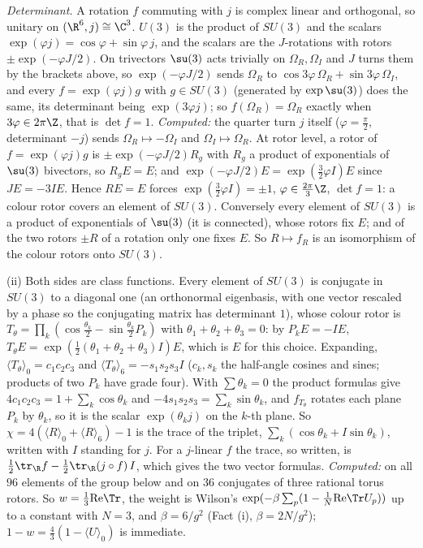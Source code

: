 \emph{Determinant.} A rotation $f$ commuting with $j$ is complex linear and orthogonal, so unitary on $(\R^6, j) \cong \C^3$. $U(3)$ is the product of $SU(3)$ and the scalars $\exp(\varphi j) = \cos\varphi + \sin\varphi\,j$, and the scalars are the $J$-rotations with rotors $\pm\exp(-\varphi J/2)$. On trivectors $\su(3)$ acts trivially on $\Omega_R, \Omega_I$ and $J$ turns them by the brackets above, so $\exp(-\varphi J/2)$ sends $\Omega_R$ to $\cos3\varphi\,\Omega_R + \sin3\varphi\,\Omega_I$, and every $f = \exp(\varphi j)g$ with $g \in SU(3)$ (generated by $\exp\su(3)$) does the same, its determinant being $\exp(3\varphi j)$; so $f(\Omega_R) = \Omega_R$ exactly when $3\varphi \in 2\pi\Z$, that is $\det f = 1$. \emph{Computed:} the quarter turn $j$ itself ($\varphi = \tfrac\pi2$, determinant $-j$) sends $\Omega_R \mapsto -\Omega_I$ and $\Omega_I \mapsto \Omega_R$. At rotor level, a rotor of $f = \exp(\varphi j)g$ is $\pm\exp(-\varphi J/2)R_g$ with $R_g$ a product of exponentials of $\su(3)$ bivectors, so $R_gE = E$; and $\exp(-\varphi J/2)E = \exp(\tfrac32\varphi I)E$ since $JE = -3IE$. Hence $RE = E$ forces $\exp(\tfrac32\varphi I) = \pm1$, $\varphi \in \tfrac{2\pi}{3}\Z$, $\det f = 1$: a colour rotor covers an element of $SU(3)$. Conversely every element of $SU(3)$ is a product of exponentials of $\su(3)$ (it is connected), whose rotors fix $E$; and of the two rotors $\pm R$ of a rotation only one fixes $E$. So $R \mapsto f_R$ is an isomorphism of the colour rotors onto $SU(3)$.

(ii) Both sides are class functions. Every element of $SU(3)$ is conjugate in $SU(3)$ to a diagonal one (an orthonormal eigenbasis, with one vector rescaled by a phase so the conjugating matrix has determinant $1$), whose colour rotor is $T_\theta = \prod_k(\cos\tfrac{\theta_k}{2} - \sin\tfrac{\theta_k}{2}P_k)$ with $\theta_1 + \theta_2 + \theta_3 = 0$: by $P_kE = -IE$, $T_\theta E = \exp(\tfrac12(\theta_1 + \theta_2 + \theta_3)I)E$, which is $E$ for this choice. Expanding, $\langle T_\theta\rangle_0 = c_1c_2c_3$ and $\langle T_\theta\rangle_6 = -s_1s_2s_3I$ ($c_k, s_k$ the half-angle cosines and sines; products of two $P_k$ have grade four). With $\sum\theta_k = 0$ the product formulas give $4c_1c_2c_3 = 1 + \sum_k\cos\theta_k$ and $-4s_1s_2s_3 = \sum_k\sin\theta_k$, and $f_{T_\theta}$ rotates each plane $P_k$ by $\theta_k$, so it is the scalar $\exp(\theta_kj)$ on the $k$-th plane. So $\chi = 4(\langle R\rangle_0 + \langle R\rangle_6) - 1$ is the trace of the triplet, $\sum_k(\cos\theta_k + I\sin\theta_k)$, written with $I$ standing for $j$. For a $j$-linear $f$ the trace, so written, is $\tfrac12\tr_{\R}f - \tfrac12\tr_{\R}(j\circ f)\,I$, which gives the two vector formulas. \emph{Computed:} on all $96$ elements of the group below and on $36$ conjugates of three rational torus rotors. So $w = \tfrac13\mathrm{Re}\Tr$, the weight is Wilson's $\exp(-\beta\sum_p(1 - \tfrac1N\mathrm{Re}\Tr U_p))$ up to a constant with $N = 3$, and $\beta = 6/g^{2}$ (Fact (i), $\beta = 2N/g^{2}$); $1 - w = \tfrac43(1 - \langle U\rangle_0)$ is immediate.

